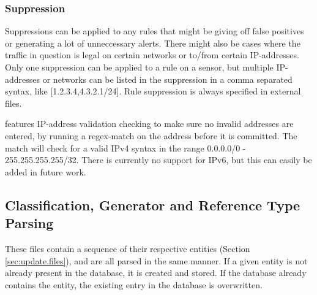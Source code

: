 \subsubsection{Suppression}
Suppressions can be applied to any rules that might be giving off false
positives or generating a lot of unneccessary alerts. There might also be cases where the
traffic in question is legal on certain networks or to/from certain
IP-addresses. Only one suppression can be applied to a rule on a sensor, but
multiple IP-addresses or networks can be listed in the suppression in a comma
separated syntax, like [1.2.3.4,4.3.2.1/24]. Rule suppression is always
specified in external files.

\snowman{} features IP-address validation checking to make sure no
invalid addresses are entered, by running a regex-match on the address before it
is committed. The match will check for a valid IPv4 syntax in the
range 0.0.0.0/0 - 255.255.255.255/32. There is currently no support for IPv6,
but this can easily be added in future work.

\subsection{Classification, Generator and Reference Type Parsing}
These files contain a sequence of their respective entities (Section
\ref{sec:update.files}), and are all parsed in the same manner. If a given entity is
not already present in the database, it is created and stored. If the database
already contains the entity, the existing entry in the database is overwritten.



